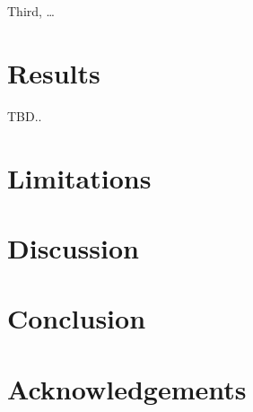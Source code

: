 \documentclass[sigplan,nonacm,review]{acmart}
\begin{document}
Third, \ldots



\section{Results}\label{sec:results}
TBD..

\section{Limitations}\label{sec:limitations}


\section{Discussion}\label{sec:discussion}


\section{Conclusion}\label{sec:conclusion}


\section{Acknowledgements}\label{sec:acks}

{\raggedright

}
\vfill\eject
\end{document}

